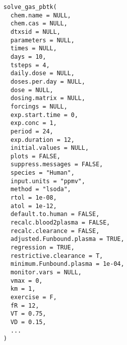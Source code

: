 \documentclass[a4paper]{book}
\begin{document}
\begin{Usage}
\begin{verbatim}
solve_gas_pbtk(
  chem.name = NULL,
  chem.cas = NULL,
  dtxsid = NULL,
  parameters = NULL,
  times = NULL,
  days = 10,
  tsteps = 4,
  daily.dose = NULL,
  doses.per.day = NULL,
  dose = NULL,
  dosing.matrix = NULL,
  forcings = NULL,
  exp.start.time = 0,
  exp.conc = 1,
  period = 24,
  exp.duration = 12,
  initial.values = NULL,
  plots = FALSE,
  suppress.messages = FALSE,
  species = "Human",
  input.units = "ppmv",
  method = "lsoda",
  rtol = 1e-08,
  atol = 1e-12,
  default.to.human = FALSE,
  recalc.blood2plasma = FALSE,
  recalc.clearance = FALSE,
  adjusted.Funbound.plasma = TRUE,
  regression = TRUE,
  restrictive.clearance = T,
  minimum.Funbound.plasma = 1e-04,
  monitor.vars = NULL,
  vmax = 0,
  km = 1,
  exercise = F,
  fR = 12,
  VT = 0.75,
  VD = 0.15,
  ...
)
\end{verbatim}
\end{Usage}
%
\end{document}
